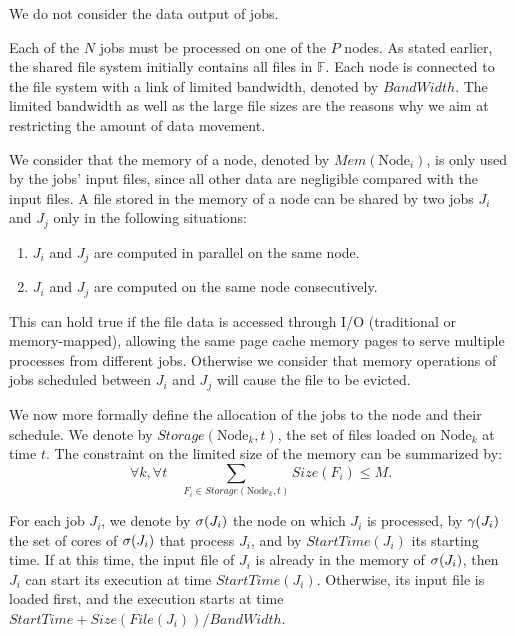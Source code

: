 \documentclass[conference,10pt]{IEEEtran}
\newcommand{\Node}[1]{\ensuremath{\mathrm{Node}_{#1}}\xspace}
\newcommand{\file}{\ensuremath{\mathit{File}}\xspace}
\newcommand{\storage}{\ensuremath{\mathit{Storage}}\xspace}
\newcommand{\size}{\ensuremath{\mathit{Size}}\xspace}
\newcommand{\memory}{\ensuremath{\mathit{Mem}}\xspace}
\newcommand{\bandwidth}{\mathit{BandWidth}\xspace}
\newcommand{\start}{\mathit{StartTime}\xspace}
\newcommand{\allocatednode}{\ensuremath\mathit{\sigma}\xspace}
\newcommand{\allocatedcores}{\ensuremath\mathit{\gamma}\xspace}
\newcommand{\fileset}{\ensuremath{\mathbb{F}}\xspace}
\begin{document}
We do not consider the data output of jobs.

Each of the $N$ jobs must be processed on one of the $P$ nodes.  As
stated earlier, the shared file system initially contains all files
in $\fileset$.  Each node is connected to the file system with a link
of limited bandwidth, denoted by $\bandwidth$.  The limited bandwidth
as well as the large file sizes are the reasons why we aim at
restricting the amount of data movement.

We consider that the memory of a node, denoted by
$\memory(\Node{i})$,
is only used by the jobs' input files, since all other data are
negligible compared with the input files.
A file stored in the memory of a node can be shared by two jobs $J_i$ and $J_j$ only in the following situations:
\begin{enumerate}
	\item $J_i$ and $J_j$ are computed in parallel on the same node.
	\item $J_i$ and $J_j$ are computed on the same node consecutively.
\end{enumerate}
This can hold true if the file data is accessed through I/O (traditional or memory-mapped),
allowing the same page cache memory pages to serve multiple processes from different jobs.
Otherwise we consider that memory operations of jobs scheduled between
$J_i$ and $J_j$ will cause the file to be evicted.

We now more formally define the allocation of the jobs to the node and
their schedule.
We denote by $\storage(\Node{k}, t)$, the set of files loaded on $\Node{k}$
at time $t$. The constraint on the limited size of the memory can be
summarized by:
$$
\forall k,\forall t \quad \sum_{F_i\in \storage(\Node{k},t)} \size(F_i)\leq M.
$$

For each job $J_i$, we denote by $\allocatednode(J_i)$ the node on which
$J_i$ is processed, by $\allocatedcores(J_i)$ the set of cores of
$\allocatednode(J_i)$ that process $J_i$, and by
$\start(J_i)$ its starting time. If at this time, the input file of
$J_i$ is already in the memory of $\allocatednode(J_i)$, then $J_i$
can start its execution at time $\start(J_i)$. Otherwise, its input
file is loaded first, and the execution starts at time 
$\start+\size(\file(J_i))/\bandwidth$.

\end{document}
